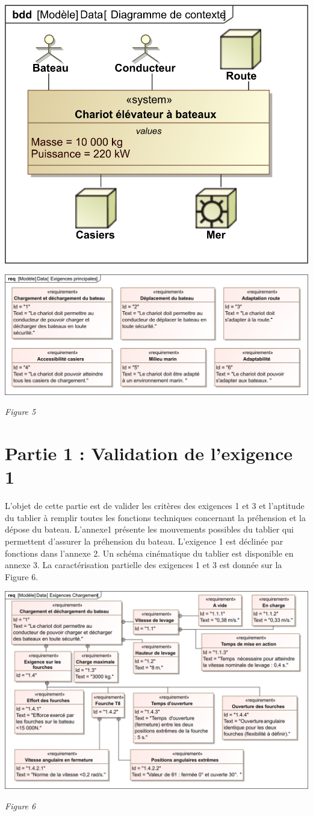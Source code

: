\documentclass[10pt,fleqn]{article} %
\begin{document}
\begin{center}
\includegraphics[width=.5\linewidth]{images/fig_05a}

\includegraphics[width=1.\linewidth]{images/fig_05}

\textit{Figure 5}
\end{center}


\section{Partie 1 : Validation de l'exigence 1}
L’objet de cette partie est de valider les critères des exigences 1 et 3 et l’aptitude du tablier à remplir toutes les fonctions techniques concernant la préhension et la dépose du bateau. L’annexe1 présente les mouvements possibles du tablier qui permettent d’assurer la préhension du bateau. L'exigence 1 est déclinée par fonctions dans l'annexe 2. Un schéma cinématique du tablier est disponible en annexe 3. La caractérisation partielle des exigences 1 et 3 est donnée sur la Figure 6.

\begin{center}
\includegraphics[width=1.\linewidth]{images/fig_06}

\textit{Figure 6}
\end{center}
\end{document}
